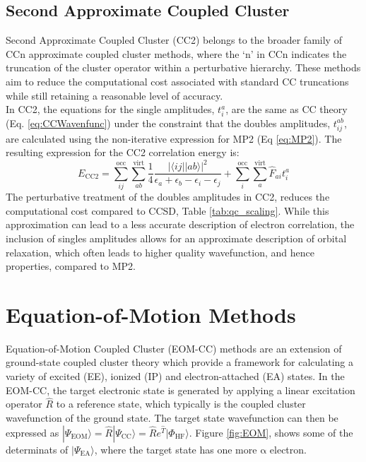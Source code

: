 \subsection{Second Approximate Coupled Cluster}\label{sec:CC2Theory}
Second Approximate Coupled Cluster (CC2) belongs to the broader family of CCn approximate coupled cluster methods, where the `n' in CCn indicates the truncation of the cluster operator within a perturbative hierarchy. These methods aim to reduce the computational cost associated with standard CC truncations while still retaining a reasonable level of accuracy.\\

In CC2, the equations for the single amplitudes, $t^a_i$, are the same as CC theory (Eq. \ref{eq:CCWavenfunc}) under the constraint that the doubles amplitudes, $t^{ab}_{ij}$, are calculated using the non-iterative expression for MP2 (Eq \ref{eq:MP2}). The resulting expression for the CC2 correlation energy is:
\begin{equation}\label{CC2Energy}
    E_{\mathrm{CC2}} = \sum_{ij}^{\mathrm{occ}} \sum_{ab}^{\mathrm{virt}} \frac{1}{4}\frac{|\langle i j || a b \rangle|^2}{\epsilon_a + \epsilon_b - \epsilon_i - \epsilon_j}  + \sum_{i}^{\mathrm{occ}} \sum_{a}^{\mathrm{virt}} \hat{F}_{ai} t^a_i 
\end{equation}
The perturbative treatment of the doubles amplitudes in CC2, reduces the computational cost compared to CCSD, Table \ref{tab:qc_scaling}. While this approximation can lead to a less accurate description of electron correlation, the inclusion of singles amplitudes allows for an approximate description of orbital relaxation, which often leads to higher quality wavefunction, and hence properties, compared to MP2.

\section{Equation-of-Motion Methods} \label{sec:eom_theory}
Equation-of-Motion Coupled Cluster (EOM-CC) methods are an extension of ground-state coupled cluster theory which provide a framework for calculating a variety of excited (EE), ionized (IP) and electron-attached (EA) states. In the EOM-CC, the target electronic state is generated by applying a linear excitation operator $\hat{R}$ to a reference state, which typically is the coupled cluster wavefunction of the ground state. The target state wavefunction can then be expressed as $|\Psi_{\mathrm{EOM}}\rangle = \hat{R} |\Psi_{\mathrm{CC}}\rangle = \hat{R} e^{\hat{T}} |\Phi_{\mathrm{HF}}\rangle$. Figure \ref{fig:EOM}, shows some of the determinats of $| \Psi_{\mathrm{EA}} \rangle$, where the target state has one more $\mathrm{\alpha}$ electron. \\

